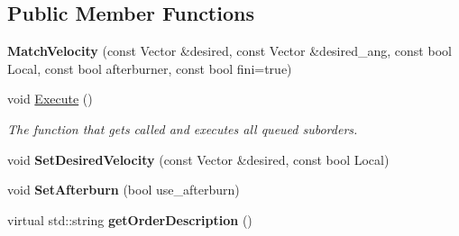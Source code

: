 \subsection*{Public Member Functions}
\begin{DoxyCompactItemize}
\item 
{\bfseries Match\+Velocity} (const Vector \&desired, const Vector \&desired\+\_\+ang, const bool Local, const bool afterburner, const bool fini=true)\hypertarget{classOrders_1_1MatchVelocity_a0a566225956806ad713522e7d79431b3}{}\label{classOrders_1_1MatchVelocity_a0a566225956806ad713522e7d79431b3}

\item 
void \hyperlink{classOrders_1_1MatchVelocity_a7097ae7ca76d4cb530fdb2cad7212851}{Execute} ()\hypertarget{classOrders_1_1MatchVelocity_a7097ae7ca76d4cb530fdb2cad7212851}{}\label{classOrders_1_1MatchVelocity_a7097ae7ca76d4cb530fdb2cad7212851}

\begin{DoxyCompactList}\small\item\em The function that gets called and executes all queued suborders. \end{DoxyCompactList}\item 
void {\bfseries Set\+Desired\+Velocity} (const Vector \&desired, const bool Local)\hypertarget{classOrders_1_1MatchVelocity_abfe5e7ab6343ebd9c0eda158886e4ffd}{}\label{classOrders_1_1MatchVelocity_abfe5e7ab6343ebd9c0eda158886e4ffd}

\item 
void {\bfseries Set\+Afterburn} (bool use\+\_\+afterburn)\hypertarget{classOrders_1_1MatchVelocity_a84e80290dd624c1610d5ab06b195bc57}{}\label{classOrders_1_1MatchVelocity_a84e80290dd624c1610d5ab06b195bc57}

\item 
virtual std\+::string {\bfseries get\+Order\+Description} ()\hypertarget{classOrders_1_1MatchVelocity_ad57154e02b9263949d8ad709f5c5bacc}{}\label{classOrders_1_1MatchVelocity_ad57154e02b9263949d8ad709f5c5bacc}

\end{DoxyCompactItemize}
